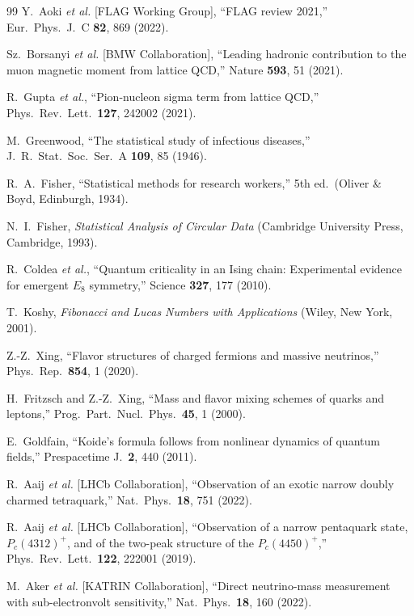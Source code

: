 \documentclass[11pt,a4paper]{article}
\begin{document}
\begin{thebibliography}{99}
  Y.~Aoki \textit{et al.} [FLAG Working Group],
  ``FLAG review 2021,''
  Eur.\ Phys.\ J.\ C \textbf{82}, 869 (2022).

  Sz.~Borsanyi \textit{et al.} [BMW Collaboration],
  ``Leading hadronic contribution to the muon magnetic moment
  from lattice QCD,''
  Nature \textbf{593}, 51 (2021).

  R.~Gupta \textit{et al.},
  ``Pion-nucleon sigma term from lattice QCD,''
  Phys.\ Rev.\ Lett.\ \textbf{127}, 242002 (2021).

  M.~Greenwood,
  ``The statistical study of infectious diseases,''
  J.\ R.\ Stat.\ Soc.\ Ser.\ A \textbf{109}, 85 (1946).

  R.~A.~Fisher,
  ``Statistical methods for research workers,''
  5th ed.\ (Oliver \& Boyd, Edinburgh, 1934).

  N.~I.~Fisher,
  \textit{Statistical Analysis of Circular Data}
  (Cambridge University Press, Cambridge, 1993).

  R.~Coldea \textit{et al.},
  ``Quantum criticality in an Ising chain: Experimental evidence
  for emergent $E_8$ symmetry,''
  Science \textbf{327}, 177 (2010).

  T.~Koshy,
  \textit{Fibonacci and Lucas Numbers with Applications}
  (Wiley, New York, 2001).

  Z.-Z.~Xing,
  ``Flavor structures of charged fermions and massive neutrinos,''
  Phys.\ Rep.\ \textbf{854}, 1 (2020).

  H.~Fritzsch and Z.-Z.~Xing,
  ``Mass and flavor mixing schemes of quarks and leptons,''
  Prog.\ Part.\ Nucl.\ Phys.\ \textbf{45}, 1 (2000).

  E.~Goldfain,
  ``Koide's formula follows from nonlinear dynamics of quantum
  fields,''
  Prespacetime J.\ \textbf{2}, 440 (2011).

  R.~Aaij \textit{et al.} [LHCb Collaboration],
  ``Observation of an exotic narrow doubly charmed tetraquark,''
  Nat.\ Phys.\ \textbf{18}, 751 (2022).

  R.~Aaij \textit{et al.} [LHCb Collaboration],
  ``Observation of a narrow pentaquark state, $P_c(4312)^+$,
  and of the two-peak structure of the $P_c(4450)^+$,''
  Phys.\ Rev.\ Lett.\ \textbf{122}, 222001 (2019).

  M.~Aker \textit{et al.} [KATRIN Collaboration],
  ``Direct neutrino-mass measurement with sub-electronvolt
  sensitivity,''
  Nat.\ Phys.\ \textbf{18}, 160 (2022).

\end{thebibliography}
\end{document}
